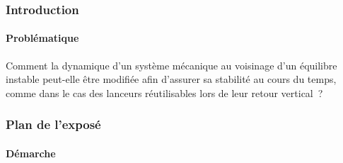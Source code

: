 
\begin{frame}
\frametitle{Introduction}
\framesubtitle{Problématique}

\vfill
\begin{center}
\begin{tcolorbox}[
    width=0.9\linewidth,
    colback=blue!5,
    colframe=blue!50!black,
    arc=4pt,
    boxrule=1pt,
    fontupper=\large
]
Comment la dynamique d'un système mécanique au voisinage d'un équilibre instable peut-elle être modifiée afin d'assurer sa stabilité au cours du temps, comme dans le cas des lanceurs réutilisables lors de leur retour vertical~?
\end{tcolorbox}
\end{center}
\vfill

\end{frame}


\begin{frame}
\frametitle{Plan de l'exposé} 
\framesubtitle{Démarche}

\tableofcontents 

\end{frame}
